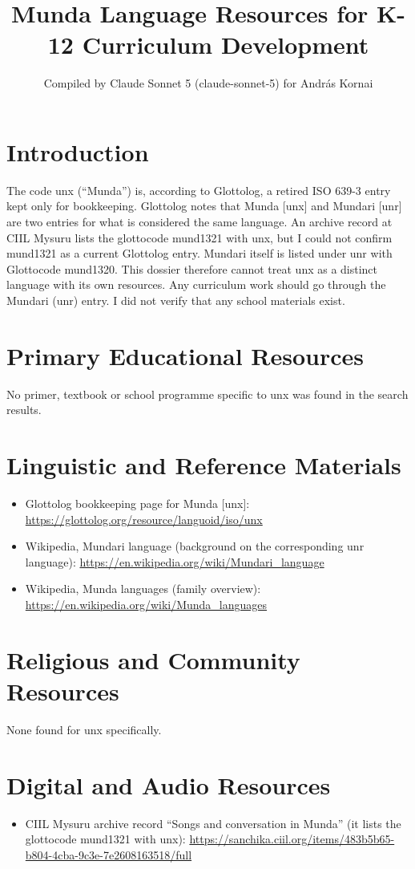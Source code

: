 \documentclass[12pt]{article}
\title{Munda Language Resources for K-12 Curriculum Development}
\author{Compiled by Claude Sonnet 5 (claude-sonnet-5) for Andr\'as Kornai}
\date{}
\begin{document}
\maketitle

\section{Introduction}
The code unx (``Munda'') is, according to Glottolog, a retired ISO 639-3 entry kept only for bookkeeping. Glottolog notes that Munda [unx] and Mundari [unr] are two entries for what is considered the same language. An archive record at CIIL Mysuru lists the glottocode mund1321 with unx, but I could not confirm mund1321 as a current Glottolog entry. Mundari itself is listed under unr with Glottocode mund1320. This dossier therefore cannot treat unx as a distinct language with its own resources. Any curriculum work should go through the Mundari (unr) entry. I did not verify that any school materials exist.

\section{Primary Educational Resources}
No primer, textbook or school programme specific to unx was found in the search results.

\section{Linguistic and Reference Materials}
\begin{itemize}
\item Glottolog bookkeeping page for Munda [unx]: \url{https://glottolog.org/resource/languoid/iso/unx}
\item Wikipedia, Mundari language (background on the corresponding unr language): \url{https://en.wikipedia.org/wiki/Mundari_language}
\item Wikipedia, Munda languages (family overview): \url{https://en.wikipedia.org/wiki/Munda_languages}
\end{itemize}

\section{Religious and Community Resources}
None found for unx specifically.

\section{Digital and Audio Resources}
\begin{itemize}
\item CIIL Mysuru archive record ``Songs and conversation in Munda'' (it lists the glottocode mund1321 with unx): \url{https://sanchika.ciil.org/items/483b5b65-b804-4cba-9c3e-7e2608163518/full}
\end{itemize}
\end{document}
